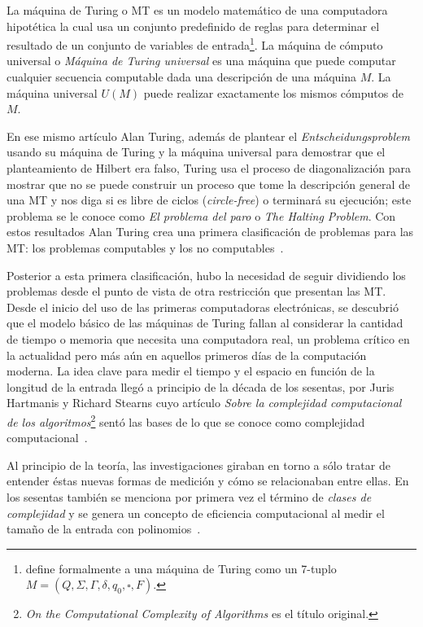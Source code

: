 La máquina de Turing o MT es un modelo matemático de una computadora hipotética
la cual usa un conjunto predefinido de reglas para determinar el resultado de
un conjunto de variables de entrada\footnote{\cite{gurovich2015introduccion}
define formalmente a una máquina de Turing como un 7-tuplo $M=(Q,\Sigma, \Gamma,
\delta, q_{0}, \square,F)$.}. La máquina de cómputo universal o \textit{Máquina
de Turing universal} es una máquina que puede computar cualquier secuencia
computable dada una descripción de una máquina $M$. La máquina universal $U(M)$
puede realizar exactamente los mismos cómputos de $M$.

En ese mismo artículo Alan Turing, además de plantear el \emph{Entscheidungsproblem}
usando su máquina de Turing y la máquina universal para demostrar que el
planteamiento de Hilbert era falso, Turing usa el proceso de diagonalización para
mostrar que no se puede construir un proceso que tome la descripción general de
una MT y nos diga si es libre de ciclos (\textit{circle-free}) o terminará su
ejecución; este problema se le conoce como \textit{El problema del paro} o
\textit{The Halting Problem}. Con estos resultados Alan Turing crea una primera
clasificación de problemas para las MT: los problemas computables y los no
computables~\cite{Turing1936}.

Posterior a esta primera clasificación, hubo la necesidad de seguir dividiendo
los problemas desde el punto de vista de otra restricción que presentan las MT.
Desde el inicio del uso de las primeras computadoras electrónicas, se
descubrió que el modelo básico de las máquinas de Turing fallan al considerar
la cantidad de tiempo o memoria que necesita una computadora real, un
problema crítico en la actualidad pero más aún en aquellos primeros días de
la computación moderna. La idea clave para medir el tiempo y el espacio en función
de la longitud de la entrada llegó a principio de la década de los sesentas,
por Juris Hartmanis y Richard Stearns cuyo artículo \textit{Sobre la complejidad
computacional de los algoritmos}\footnote{\textit{On the Computational
Complexity of Algorithms} es el título original.} sentó las bases de lo que
se conoce como complejidad computacional~\cite{Hartmanis1965}.

Al principio de la teoría, las investigaciones giraban en torno a
sólo tratar de entender éstas nuevas formas de medición y cómo se
relacionaban entre ellas. En los sesentas también se menciona por primera vez el
término de \textit{clases de complejidad} y se genera un concepto de eficiencia
computacional al medir el tamaño de la entrada con polinomios~\cite{Fortnow2002}.

